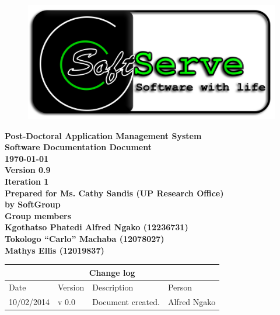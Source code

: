 \documentclass[12pt]{article}
\newcommand{\Title}{Software Documentation Document} %
\newcommand{\ssr}{Soft\color{green}{Serve }\color{black}}
\newcommand{\version}{0.9}
\newcommand{\iteration}{1}
\newcommand{\client}{Ms. Cathy Sandis (UP Research Office)}
\newcommand{\project}{Post-Doctoral Application Management System}
\begin{document}
\vspace{4em}

\begin{center}%

\begin{figure}[ht!]
\centering
\includegraphics{../Images_Docs/logo.png}
\end{figure}
\LARGE \bf \project \\[1em]
\LARGE \bf \Title \\[0.25em]
\large \bf \today\\
\bf Version \version\\
\bf Iteration \iteration\\[0.5em]
\Large \bf Prepared for \client\\
\Large \bf by
\Large {\bf \ssr Group }\\[0.5em]
\LARGE {\bf Group members}\\[0.25em]
\large
Kgothatso Phatedi Alfred Ngako (12236731) \\[0.5em]
Tokologo “Carlo” Machaba (12078027) \\[0.5em]
Mathys Ellis (12019837) \\[8em]

\end{center}%


\begin{center}
\begin{tabular}{|l|p{1.4cm}|p{8cm}|p{2.8cm}|}
\hline
\multicolumn{4}{|c|}{\bf Change log} \\
\hline
 Date & Version & Description &  Person \\
\hline
10/02/2014 & v 0.0 & Document created. & Alfred Ngako \\
\hline
\end{tabular}
\end{center}
\newpage
\tableofcontents
\end{document}
